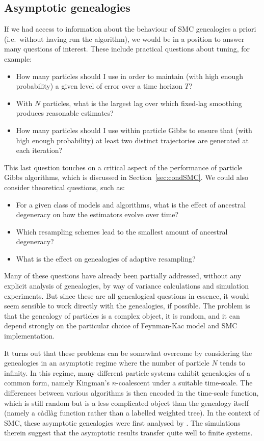 \subsection{Asymptotic genealogies}
If we had access to information about the behaviour of SMC genealogies a priori (i.e.\ without having run the algorithm), we would be in a position to answer many questions of interest. These include practical questions about tuning, for example:
\begin{itemize}
\item How many particles should I use in order to maintain (with high enough probability) a given level of error over a time horizon $T$?
\item With $N$ particles, what is the largest lag over which fixed-lag smoothing produces reasonable estimates?
\item How many particles should I use within particle Gibbs to ensure that (with high enough probability) at least two distinct trajectories are generated at each iteration?
\end{itemize}
This last question touches on a critical aspect of the performance of particle Gibbs algorithms, which is discussed in Section~\ref{sec:condSMC}.
We could also consider theoretical questions, such as:
\begin{itemize}
\item For a given class of models and algorithms, what is the effect of ancestral degeneracy on how the estimators evolve over time?
\item Which resampling schemes lead to the smallest amount of ancestral degeneracy?
\item What is the effect on genealogies of adaptive resampling?
\end{itemize}
Many of these questions have already been partially addressed, without any explicit analysis of genealogies, by way of variance calculations and simulation experiments.
But since these are all genealogical questions in essence, it would seem sensible to work directly with the genealogies, if possible.
The problem is that the genealogy of particles is a complex object, it is random, and it can depend strongly on the particular choice of Feynman-Kac model and SMC implementation.

It turns out that these problems can be somewhat overcome by considering the genealogies in an asymptotic regime where the number of particle $N$ tends to infinity.
In this regime, many different particle systems exhibit genealogies of a common form, namely Kingman's $n$-coalescent under a suitable time-scale. The differences between various algorithms is then encoded in the time-scale function, which is still random but is a less complicated object than the genealogy itself (namely a c\`adl\`ag function rather than a labelled weighted tree).
In the context of SMC, these asymptotic genealogies were first analysed by \textcite{koskela2018}. The simulations therein suggest that the asymptotic results transfer quite well to finite systems.

